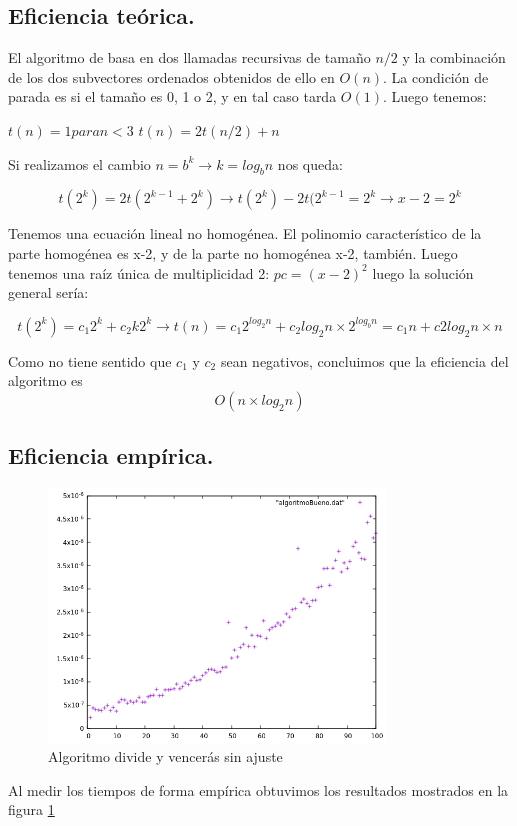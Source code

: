 \documentclass[a4paper, 11pt]{article}
\begin{document}
\subsection{Eficiencia teórica.}
El algoritmo de basa en dos llamadas recursivas de tamaño $n/2$ y la combinación de los dos subvectores ordenados obtenidos de ello en $O(n)$.
La condición de parada es si el tamaño es 0, 1 o 2, y en tal caso tarda $O(1)$.
Luego tenemos:

$t(n)=1 para n<3$
$t(n)=2t(n/2)+n$

Si realizamos el cambio $n=b^k\rightarrow k=log_b n$ nos queda: 

$$t(2^k) = 2t(2^{k-1} + 2^k) \rightarrow t(2^k) - 2t(2^{k-1} = 2^k \rightarrow x-2 = 2^k$$

Tenemos una ecuación lineal no homogénea. El polinomio característico de la parte homogénea es x-2, y de la parte no homogénea x-2, también. Luego tenemos una raíz única de multiplicidad 2: $pc=(x-2)^2$ luego la solución general sería:

$$ t(2^k)=c_1 2^k + c_2 k 2^k \rightarrow t(n) = c_1 2^{log_2 n} + c_2 log_2 n \times 2^{log_b n} = c_1 n + c2 log_2 n \times n$$

Como no tiene sentido que $c_1$ y $c_2$ sean negativos, concluimos que la eficiencia del algoritmo es $$O(n \times log_2 n)$$

\subsection{Eficiencia empírica.}
\begin{figure}[!hbp]
	\includegraphics[width=0.8\textwidth]{algBueno.png}
	\caption{Algoritmo divide y vencerás sin ajuste	\label{Algoritmo divide y vencerás análisis empírico}}
\end{figure}
Al medir los tiempos de forma empírica obtuvimos los resultados mostrados en la figura \ref{Algoritmo divide y vencerás análisis empírico}
\end{document}
